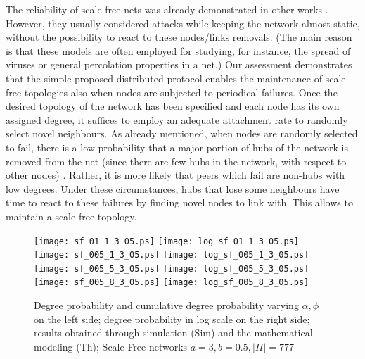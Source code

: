 \documentclass[a4paper,twosided]{article}
\begin{document}
The reliability of scale-free nets was already demonstrated in other works \cite{Verlag03structuralproperties,Newman03thestructure,2000Nature_Albert,dumitriu}. However, they usually considered attacks while keeping the network almost static, without the possibility to react to these nodes/links removals. (The main reason is that these models are often employed for studying, for instance, the spread of viruses or general percolation properties in a net.) Our assessment demonstrates that the simple proposed distributed protocol enables the maintenance of scale-free topologies also when nodes are subjected to periodical failures. Once the desired topology of the network has been specified and each node has its own assigned degree, it suffices to employ an adequate attachment rate to randomly select novel neighbours.
As already mentioned, when nodes are randomly selected to fail, there is a low probability that a major portion of hubs of the network is removed from the net (since there are few hubs in the network, with respect to other nodes) \cite{Newman03thestructure,newmanHandbook}. Rather, it is more likely that peers which fail are non-hubs with low degrees. Under these circumstances, hubs that lose some neighbours have time to react to these failures by finding novel nodes to link with. This allows to maintain a scale-free topology.

\begin{figure}
   \centering
   \texttt{[image: sf\_01\_1\_3\_05.ps]}
   \texttt{[image: log\_sf\_01\_1\_3\_05.ps]}
   \texttt{[image: sf\_005\_1\_3\_05.ps]}
   \texttt{[image: log\_sf\_005\_1\_3\_05.ps]}
   \texttt{[image: sf\_005\_5\_3\_05.ps]}
   \texttt{[image: log\_sf\_005\_5\_3\_05.ps]}
   \texttt{[image: sf\_005\_8\_3\_05.ps]}
   \texttt{[image: log\_sf\_005\_8\_3\_05.ps]}
   \caption{Degree probability and cumulative degree probability varying $\alpha, \phi$ on the left side; degree probability in log scale on the right side; results obtained through simulation (Sim) and the mathematical modeling (Th); Scale Free networks $a=3, b=0.5, |\Pi|=777$}
   \label{fig:fig_sf9}
\end{figure}
\end{document}
